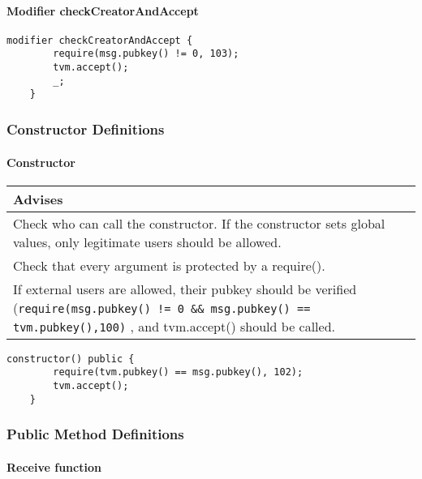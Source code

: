 \paragraph{Modifier checkCreatorAndAccept}


\begin{lstlisting}[firstnumber=58]
	modifier checkCreatorAndAccept {
		require(msg.pubkey() != 0, 103);
		tvm.accept();
		_;
	}
\end{lstlisting}

\subsubsection{Constructor Definitions}


\paragraph{Constructor}

\ifsoldraft
\noindent\begin{tabular}{|p{12cm}|}\hline
\rowcolor{green}Advises
\\\hline
Check who can call the constructor. If the constructor sets global values, only legitimate users should be allowed.
\\\hline
Check that every argument is protected by a require().
\\\hline
If external users are allowed, their pubkey should be verified (\verb+require(msg.pubkey() != 0 && msg.pubkey() == tvm.pubkey(),100)+ , and tvm.accept() should be called.
\\\hline\end{tabular}
\fi
\vspace{2cm}

\begin{lstlisting}[firstnumber=65]
	constructor() public {
		require(tvm.pubkey() == msg.pubkey(), 102);
		tvm.accept();
	}
\end{lstlisting}

\subsubsection{Public Method Definitions}


\paragraph{Receive function}

\vspace{2cm}


